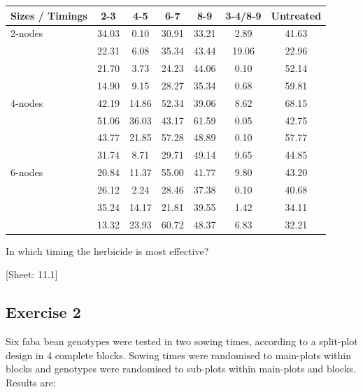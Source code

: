 \documentclass[a4paper,12pt,oneside]{book}
\begin{document}
\begin{longtable}[]{@{}lcccccc@{}}
\toprule()
Sizes / Timings & 2-3 & 4-5 & 6-7 & 8-9 & 3-4/8-9 & Untreated \\
\midrule()
\endhead
2-nodes & 34.03 & 0.10 & 30.91 & 33.21 & 2.89 & 41.63 \\
& 22.31 & 6.08 & 35.34 & 43.44 & 19.06 & 22.96 \\
& 21.70 & 3.73 & 24.23 & 44.06 & 0.10 & 52.14 \\
& 14.90 & 9.15 & 28.27 & 35.34 & 0.68 & 59.81 \\
4-nodes & 42.19 & 14.86 & 52.34 & 39.06 & 8.62 & 68.15 \\
& 51.06 & 36.03 & 43.17 & 61.59 & 0.05 & 42.75 \\
& 43.77 & 21.85 & 57.28 & 48.89 & 0.10 & 57.77 \\
& 31.74 & 8.71 & 29.71 & 49.14 & 9.65 & 44.85 \\
6-nodes & 20.84 & 11.37 & 55.00 & 41.77 & 9.80 & 43.20 \\
& 26.12 & 2.24 & 28.46 & 37.38 & 0.10 & 40.68 \\
& 35.24 & 14.17 & 21.81 & 39.55 & 1.42 & 34.11 \\
& 13.32 & 23.93 & 60.72 & 48.37 & 6.83 & 32.21 \\
\bottomrule()
\end{longtable}

In which timing the herbicide is most effective?

{[}Sheet: 11.1{]}

\hypertarget{exercise-2-7}{%
\subsection{Exercise 2}\label{exercise-2-7}}

Six faba bean genotypes were tested in two sowing times, according to a split-plot design in 4 complete blocks. Sowing times were randomised to main-plots within blocks and genotypes were randomised to sub-plots within main-plots and blocks. Results are:
\end{document}
